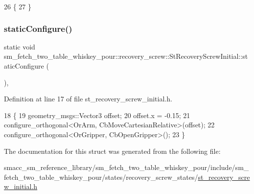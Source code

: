 \begin{DoxyCode}
26             \{
27             \}
\end{DoxyCode}
\mbox{\label{structsm__fetch__two__table__whiskey__pour_1_1recovery__screw_1_1StRecoveryScrewInitial_a07b2bbae31e8a613fa27c9fc243698bb}} 
\subsubsection{\texorpdfstring{static\+Configure()}{staticConfigure()}}
{\footnotesize\ttfamily static void sm\+\_\+fetch\+\_\+two\+\_\+table\+\_\+whiskey\+\_\+pour\+::recovery\+\_\+screw\+::\+St\+Recovery\+Screw\+Initial\+::static\+Configure (\begin{DoxyParamCaption}{ }\end{DoxyParamCaption})\hspace{0.3cm}{\ttfamily [inline]}, {\ttfamily [static]}}



Definition at line 17 of file st\+\_\+recovery\+\_\+screw\+\_\+initial.\+h.


\begin{DoxyCode}
18             \{
19                 geometry\_msgs::Vector3 offset;
20                 offset.x = -0.15;
21                 configure\_orthogonal<OrArm, CbMoveCartesianRelative>(offset);
22                 configure\_orthogonal<OrGripper, CbOpenGripper>();
23             \}
\end{DoxyCode}


The documentation for this struct was generated from the following file\+:\begin{DoxyCompactItemize}
\item 
smacc\+\_\+sm\+\_\+reference\+\_\+library/sm\+\_\+fetch\+\_\+two\+\_\+table\+\_\+whiskey\+\_\+pour/include/sm\+\_\+fetch\+\_\+two\+\_\+table\+\_\+whiskey\+\_\+pour/states/recovery\+\_\+screw\+\_\+states/\hyperlink{sm__fetch__two__table__whiskey__pour_2include_2sm__fetch__two__table__whiskey__pour_2states_2rec8e1db34371f3a177e6376b1a2bade566}{st\+\_\+recovery\+\_\+screw\+\_\+initial.\+h}\end{DoxyCompactItemize}
